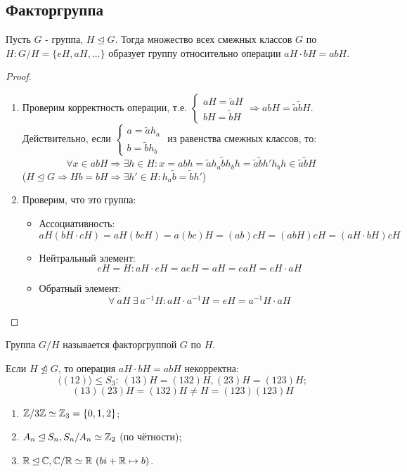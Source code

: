 \subsection{Факторгруппа}
\begin{subtheorem}
    Пусть $G$ - группа, $H\unlhd G$. Тогда множество всех смежных классов $G$ по $H : G/H = \{eH, aH, ...\}$ образует группу относительно операции $aH \cdot bH = abH$.
\end{subtheorem}
\begin{proof}\tab
    \begin{enumerate}
        \item Проверим корректность операции, т.е. $\begin{cases}
            aH = \tilde{a}H\\
            bH = \tilde{b}H
        \end{cases} \Longrightarrow abH = \tilde{a}\tilde{b}H$.\\
        Действительно, если $\begin{cases}
            a = \tilde{a}h_a\\
            b = \tilde{b}h_b
        \end{cases}$ из равенства смежных классов, то:
        \[\forall x \in abH \Longrightarrow \exists h\in H: x = abh = \tilde{a}h_a\tilde{b}h_bh = \tilde{a}\tilde{b}h'h_bh \in \tilde{a}\tilde{b}H\]
        ($H \unlhd G \Longrightarrow Hb = bH \Longrightarrow \exists h' \in H: h_a\tilde{b} = \tilde{b}h'$)
        \item Проверим, что это группа:
        \begin{itemize}
            \item Ассоциативность:
            \[aH(bH\cdot cH) = aH(bcH) = a(bc)H = (ab)cH = (abH)cH = (aH\cdot bH)cH\]
            \item Нейтральный элемент:
            \[eH = H: aH \cdot eH = aeH = aH = eaH = eH\cdot aH\]
            \item Обратный элемент:
            \[\forall \ aH \ \exists \ a^{-1}H: aH \cdot a^{-1}H = eH = a^{-1}H \cdot aH\]
        \end{itemize}
    \end{enumerate}
\end{proof}
\begin{definition}
    Группа $G/H$ называется факторгруппой $G$ по $H$.
\end{definition}
\begin{remark}
    Если $H \ntrianglelefteq G$, то операция $aH\cdot bH = abH$ некорректна:
    \[\langle(12)\rangle \leq S_3: \ (13)H = (132)H, (23)H = (123)H;\]
    \[(13)(23)H = (132)H \neq H = (123)(123)H\]
\end{remark}
\begin{examples}\tab
    \begin{enumerate}
        \item $\mathbb{Z} / 3\mathbb{Z} \simeq \mathbb{Z}_3 = \{0, 1, 2\}$;
        \item $A_n \unlhd S_n, S_n/A_n \simeq \mathbb{Z}_2$ (по чётности);
        \item $\R \unlhd \CC, \CC / \R \simeq \R \ (bi + \R \mapsto b)$. 
    \end{enumerate}
\end{examples}

